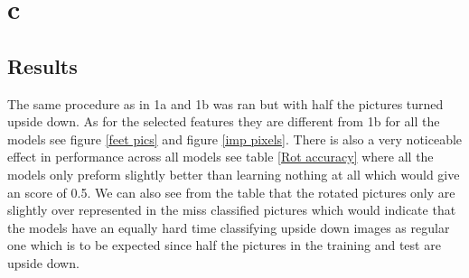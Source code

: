 \documentclass{article}
\begin{document}
\newpage
\section{c}
\subsection{Results}
The same procedure as in 1a and 1b was ran but with half the pictures turned upside down. As for the selected features they are different from 1b for all the models see figure \ref{feet pics} and figure \ref{imp pixels}. There is also a very noticeable effect in performance across all models see table \ref{Rot accuracy} where all the models only preform slightly better than learning nothing at all which would give an score of 0.5. We can also see from the table that the rotated pictures only are slightly over represented in the miss classified pictures which would indicate that the models have an equally hard time classifying upside down images as regular one which is to be expected since half the pictures in the training and test are upside down.    
\end{document}
